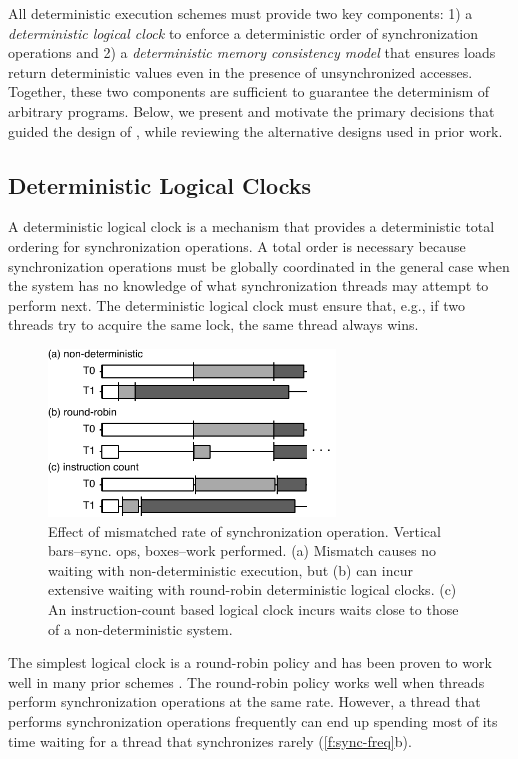 All deterministic execution schemes must provide two key components: 1) a \emph{deterministic logical clock} to enforce a deterministic order of synchronization operations and 2) a \emph{deterministic memory consistency model} that ensures loads return deterministic values even in the presence of unsynchronized accesses. Together, these two components are sufficient to guarantee the determinism of arbitrary programs. Below, we present and motivate the primary decisions that guided the design of \lib{}, while reviewing the alternative designs used in prior work.

\subsection{Deterministic Logical Clocks}
\label{s:dlc}

A deterministic logical clock is a mechanism that provides a deterministic total ordering for synchronization operations. A total order is necessary because synchronization operations must be globally coordinated in the general case when the system has no knowledge of what synchronization threads may attempt to perform next. The deterministic logical clock must ensure that, e.g., if two threads try to acquire the same lock, the same thread always wins. 

\begin{figure}
\centering
\includegraphics[width=3.0in]{figures/sync-frequency.pdf}
\caption{Effect of mismatched rate of synchronization operation. Vertical bars--sync. ops, boxes--work performed. (a) Mismatch causes no waiting with non-deterministic execution, but (b) can incur extensive waiting with round-robin deterministic logical clocks. (c) An instruction-count based logical clock \cite{olszewski_kendo:_2009} incurs waits close to those of a non-deterministic system. }
\label{f:sync-freq}
\end{figure}

The simplest logical clock is a round-robin policy and has been proven to work well in many prior schemes \cite{devietti_dmp:_2009,bergan_coredet:_2010,derek_r._hower_calvin:_2011,liu_dthreads:_2011,merrifield_conversion:_2013}. The round-robin policy works well when threads perform synchronization operations at the same rate. However, a thread that performs synchronization operations frequently can end up spending most of its time waiting for a thread that synchronizes rarely (\autoref{f:sync-freq}b).

